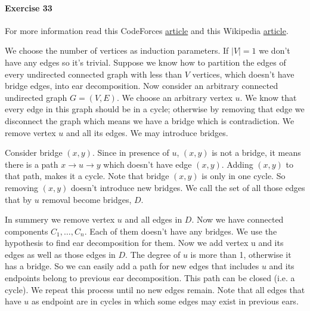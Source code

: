 \documentclass{book}
\begin{document}
	\paragraph{Exercise 33}
	For more information read this CodeForces \href{https://codeforces.com/blog/entry/80932}{article} and this Wikipedia \href{https://en.wikipedia.org/wiki/Ear_decomposition}{article}.
	\par We choose the number of vertices as induction parameters. If $|V| = 1$ we don't have any edges so it's trivial. Suppose we know how to partition the edges of every undirected connected graph with less than $V$ vertices, which doesn't have bridge edges, into ear decomposition. Now consider an arbitrary connected undirected graph $G = (V, E)$. We choose an arbitrary vertex $u$. We know that every edge in this graph should be in a cycle; otherwise by removing that edge we disconnect the graph which means we have a bridge which is contradiction. We remove vertex $u$ and all its edges. We may introduce bridges.
	\par Consider bridge $(x, y)$. Since in presence of $u$, $(x, y)$ is not a bridge, it means there is a path $x \to u \to y$ which doesn't have edge $(x, y)$. Adding $(x, y)$ to that path, makes it a cycle. Note that bridge $(x, y)$ is only in one cycle. So removing $(x, y)$ doesn't introduce new bridges. We call the set of all those edges that by $u$ removal become bridges, $D$.
	\par In summery we remove vertex $u$ and all edges in $D$. Now we have connected components $C_1, \dots, C_n$. Each of them doesn't have any bridges. We use the hypothesis to find ear decomposition for them. Now we add vertex u and its edges as well as those edges in $D$. The degree of $u$ is more than 1, otherwise it has a bridge. So we can easily add a path for new edges that includes $u$ and its endpoints belong to previous ear decomposition. This path can be closed (i.e. a cycle). We repeat this process until no new edges remain. Note that all edges that have $u$ as endpoint are in cycles in which some edges may exist in previous ears.
\end{document}
